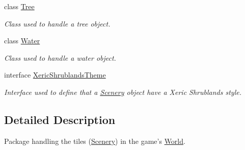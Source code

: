 \begin{DoxyCompactItemize}
class \hyperlink{a00033}{Tree}
\begin{DoxyCompactList}\small\item\em Class used to handle a tree object. \end{DoxyCompactList}\item 
class \hyperlink{a00036}{Water}
\begin{DoxyCompactList}\small\item\em Class used to handle a water object. \end{DoxyCompactList}\item 
interface \hyperlink{a00040}{Xeric\-Shrublands\-Theme}
\begin{DoxyCompactList}\small\item\em Interface used to define that a \hyperlink{a00024}{Scenery} object have a Xeric Shrublands style. \end{DoxyCompactList}\end{DoxyCompactItemize}


\subsection{Detailed Description}
Package handling the tiles (\hyperlink{a00024}{Scenery}) in the game's \hyperlink{a00039}{World}. 